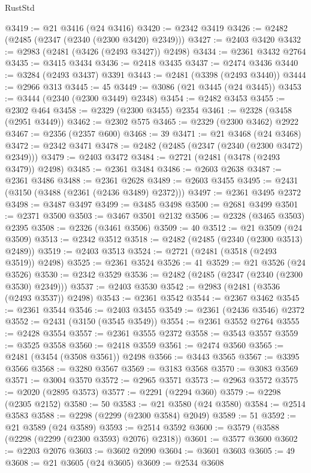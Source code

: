\begin{lexlean}{RustStd}
\begin{coremodule}
@3419 := @21 @3416 (@24 @3416)
@3420 := @2342 @3419
@3426 := @2482 (@2485 (@2347 (@2340 (@2300 @3420) @2349)))
@3427 := @2403 @3420
@3432 := @2983 (@2481 (@3426 (@2493 @3427)) @2498)
@3434 := @2361 @3432 @2764
@3435 := @3415 @3434
@3436 := @2418 @3435
@3437 := @2474 @3436
@3440 := @3284 (@2493 @3437) @3391
@3443 := @2481 (@3398 (@2493 @3440))
@3444 := @2966 @313
@3445 := 45
@3449 := @3086 (@21 @3445 (@24 @3445))
@3453 := @3444 (@2340 (@2300 @3449) @2348)
@3454 := @2482 @3453
@3455 := @2302 @464
@3458 := @2329 (@2300 @3455) @2354
@3461 := @2328 (@3458 (@2951 @3449))
@3462 := @2302 @575
@3465 := @2329 (@2300 @3462) @2922
@3467 := @2356 (@2357 @600)
@3468 := 39
@3471 := @21 @3468 (@24 @3468)
@3472 := @2342 @3471
@3478 := @2482 (@2485 (@2347 (@2340 (@2300 @3472) @2349)))
@3479 := @2403 @3472
@3484 := @2721 (@2481 (@3478 (@2493 @3479)) @2498)
@3485 := @2361 @3484
@3486 := @2603 @2638
@3487 := @2361 @3486
@3488 := @2361 @2628
@3489 := @2603 @3455
@3495 := @2431 (@3150 (@3488 (@2361 (@2436 @3489) @2372)))
@3497 := @2361 @3495 @2372
@3498 := @3487 @3497
@3499 := @3485 @3498
@3500 := @2681 @3499
@3501 := @2371 @3500
@3503 := @3467 @3501 @2132
@3506 := @2328 (@3465 @3503) @2395
@3508 := @2326 (@3461 @3506)
@3509 := 40
@3512 := @21 @3509 (@24 @3509)
@3513 := @2342 @3512
@3518 := @2482 (@2485 (@2340 (@2300 @3513) @2489))
@3519 := @2403 @3513
@3524 := @2721 (@2481 (@3518 (@2493 @3519)) @2498)
@3525 := @2361 @3524
@3526 := 41
@3529 := @21 @3526 (@24 @3526)
@3530 := @2342 @3529
@3536 := @2482 (@2485 (@2347 (@2340 (@2300 @3530) @2349)))
@3537 := @2403 @3530
@3542 := @2983 (@2481 (@3536 (@2493 @3537)) @2498)
@3543 := @2361 @3542
@3544 := @2367 @3462
@3545 := @2361 @3544
@3546 := @2403 @3455
@3549 := @2361 (@2436 @3546) @2372
@3552 := @2431 (@3150 (@3545 @3549))
@3554 := @2361 @3552 @2764
@3555 := @2428 @3554
@3557 := @2361 @3555 @2372
@3558 := @3543 @3557
@3559 := @3525 @3558
@3560 := @2418 @3559
@3561 := @2474 @3560
@3565 := @2481 (@3454 (@3508 @3561)) @2498
@3566 := @3443 @3565
@3567 := @3395 @3566
@3568 := @3280 @3567
@3569 := @3183 @3568
@3570 := @3083 @3569
@3571 := @3004 @3570
@3572 := @2965 @3571
@3573 := @2963 @3572
@3575 := @2020 (@2895 @3573)
@3577 := @2291 (@2294 @360)
@3579 := @2298 (@2305 @2152)
@3580 := 50
@3583 := @21 @3580 (@24 @3580)
@3584 := @2514 @3583
@3588 := @2298 (@2299 (@2300 @3584) @2049)
@3589 := 51
@3592 := @21 @3589 (@24 @3589)
@3593 := @2514 @3592
@3600 := @3579 (@3588 (@2298 (@2299 (@2300 @3593) @2076) @2318))
@3601 := @3577 @3600
@3602 := @2203 @2076
@3603 := @3602 @2090
@3604 := @3601 @3603
@3605 := 49
@3608 := @21 @3605 (@24 @3605)
@3609 := @2534 @3608

\end{coremodule}
\end{lexlean}
